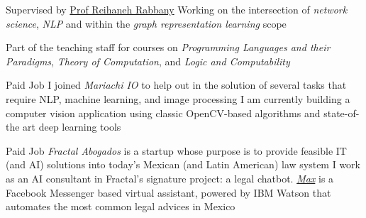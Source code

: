 \documentclass[8pt,a4paper,sans]{moderncv} %
\begin{document}
        {Supervised by \href{https;//wwww.reirab.com}{Prof Reihaneh Rabbany}}
        {Working on the intersection of \emph{network science}, \emph{NLP} and within the \emph{graph representation learning} scope}
        {}
        {}

        {Part of the teaching staff for courses on \emph{Programming Languages and their Paradigms},
         \emph{Theory of Computation}, and \emph{Logic and Computability}}
        {}
        {}
        {}
        
        {Paid Job}
        {I joined \emph{Mariachi IO} to help out in the solution of several tasks that require NLP, machine learning, and image processing}
        {I am currently building a computer vision application using classic OpenCV-based algorithms and state-of-the art deep learning tools}
        {}
        {}

        {Paid Job}
        {\emph{Fractal Abogados} is a startup whose purpose is to provide feasible IT (and AI) solutions into today's Mexican (and Latin American) law system}
        {I work as an AI consultant in Fractal's signature project: a legal chatbot. \href{https://m.me/fractal-abogados}{\emph{Max}} is a Facebook Messenger based virtual assistant, powered by IBM Watson that automates the most common legal advices in Mexico}
        {}
        {}
\end{document}

